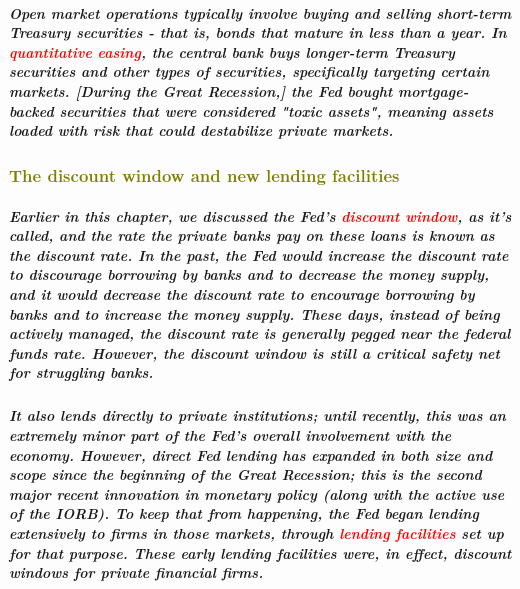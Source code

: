 \documentclass[11pt]{article} %
\begin{document}
{\begin{center}
\end{center}
\subparagraph*{Open market operations typically involve buying and selling short-term Treasury securities - that is, bonds that mature in less than a year. In \textbf{\textcolor{red}{quantitative easing}}, the central bank buys longer-term Treasury securities and other types of securities, specifically targeting certain markets. [During the Great Recession,] the Fed bought mortgage-backed securities that were considered "toxic assets", meaning assets loaded with risk that could destabilize private markets.
}

\subsubsection*{\textcolor{olive}{The discount window and new lending facilities}}
\subparagraph*{Earlier in this chapter, we discussed the Fed's \textbf{\textcolor{red}{discount window}}, as it's called, and the rate the private banks pay on these loans is known as the discount rate. In the past, the Fed would increase the discount rate to discourage borrowing by banks and to decrease the money supply, and it would decrease the discount rate to encourage borrowing by banks and to increase the money supply. These days, instead of being actively managed, the discount rate is generally pegged near the federal funds rate. However, the discount window is still a critical safety net for struggling banks.}
\subparagraph*{It also lends directly to private institutions; until recently, this was an extremely minor part of the Fed's overall involvement with the economy. However, direct Fed lending has expanded in both size and scope since the beginning of the Great Recession; this is the second major recent innovation in monetary policy (along with the active use of the IORB). To keep that from happening, the Fed began lending extensively to firms in those markets, through \textbf{\textcolor{red}{lending facilities}} set up for that purpose. These early lending facilities were, in effect, discount windows for private financial firms.}
}
\end{document}
